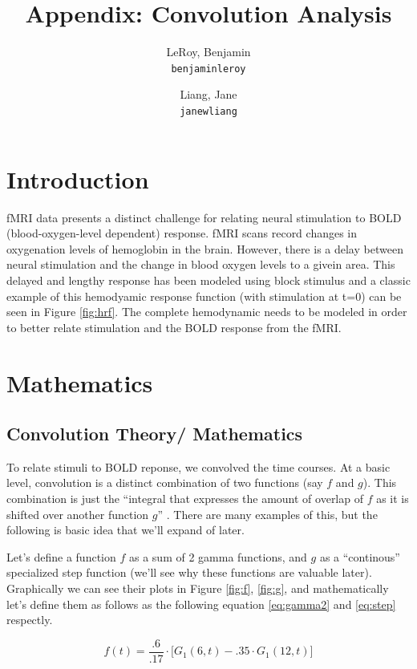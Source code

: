 \documentclass[11pt]{article}
\title{Appendix: Convolution Analysis}
\author{
  LeRoy, Benjamin\\
  \texttt{benjaminleroy}
  \and
  Liang, Jane\\
  \texttt{janewliang}
}
\begin{document}
\maketitle


\section{Introduction}

fMRI data presents a distinct challenge for relating neural stimulation 
to BOLD (blood-oxygen-level dependent) response. fMRI scans record changes 
in oxygenation levels of hemoglobin in the brain. However, there is a delay 
between neural stimulation and the change in blood oxygen levels to a givein 
area. This delayed and lengthy response has been modeled using block stimulus 
and a classic example of this hemodyamic response function (with stimulation 
at t=0) can be seen in Figure \ref{fig:hrf}. The complete hemodynamic needs 
to be modeled in order to better relate  stimulation and the BOLD response 
from the fMRI.

\section{Mathematics}
\subsection{Convolution Theory/ Mathematics}

To relate stimuli to BOLD reponse, we convolved the time courses. At a basic 
level, convolution is a distinct combination of two functions (say $f$ and $g$).
 This combination is just the ``integral that expresses the amount of overlap of
  $f$ as it is shifted over another function $g$''  
  \cite{weissten2015convolution}. There are many examples of this, but the 
  following is basic idea that we'll expand of later. 

Let's define a function $f$ as a sum of 2 gamma functions, and $g$ as a 
``continous'' specialized step function  (we'll see why these functions are 
valuable later). Graphically we can see their plots in Figure \ref{fig:f}, 
\ref{fig:g}, and mathematically let's define them as follows as the following 
equation \ref{eq:gamma2} and \ref{eq:step} respectly.

\begin{equation} \label{eq:gamma2}
f(t)=\frac{.6}{.17}\cdot  \big[G_1(6,t)-.35 \cdot G_1(12,t) \big]
\end{equation}
\end{document}
